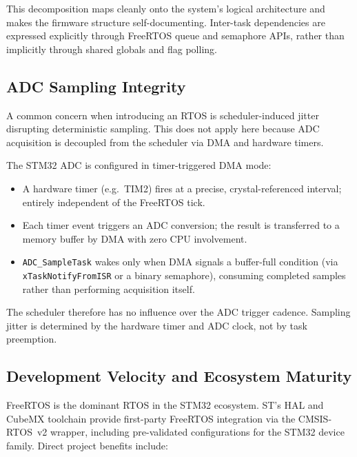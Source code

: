 This decomposition maps cleanly onto the system's logical architecture and makes the
firmware structure self-documenting. Inter-task dependencies are expressed explicitly
through FreeRTOS queue and semaphore APIs, rather than implicitly through shared
globals and flag polling.

\subsection{ADC Sampling Integrity}

A common concern when introducing an RTOS is scheduler-induced jitter disrupting
deterministic sampling. This does not apply here because ADC acquisition is decoupled
from the scheduler via DMA and hardware timers.

The STM32 ADC is configured in timer-triggered DMA mode:

\begin{itemize}[noitemsep]
    \item A hardware timer (e.g.\ TIM2) fires at a precise, crystal-referenced
          interval; entirely independent of the FreeRTOS tick.
    \item Each timer event triggers an ADC conversion; the result is transferred to a
          memory buffer by DMA with zero CPU involvement.
    \item \texttt{ADC\_SampleTask} wakes only when DMA signals a buffer-full condition
          (via \texttt{xTaskNotifyFromISR} or a binary semaphore), consuming completed
          samples rather than performing acquisition itself.
\end{itemize}

The scheduler therefore has no influence over the ADC trigger cadence. Sampling jitter
is determined by the hardware timer and ADC clock, not by task preemption. 

\subsection{Development Velocity and Ecosystem Maturity}

FreeRTOS is the dominant RTOS in the STM32 ecosystem. ST's HAL and CubeMX toolchain
provide first-party FreeRTOS integration via the CMSIS-RTOS~v2 wrapper, including
pre-validated configurations for the STM32 device family. Direct project benefits
include:

